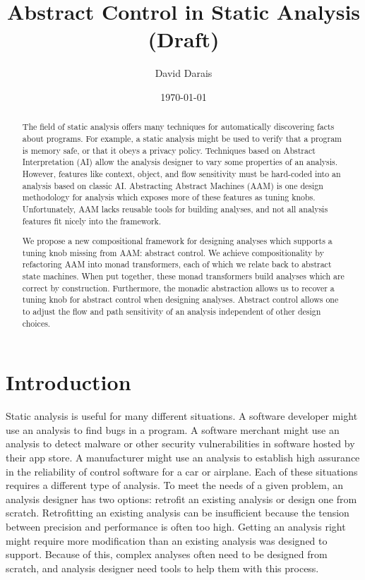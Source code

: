 \documentclass{article}
\title{Abstract Control in Static Analysis (Draft)}
\author{David Darais}
\date{\today}
\begin{document}
\maketitle


\begin{abstract}

The field of static analysis offers many techniques for automatically discovering facts about programs.
For example, a static analysis might be used to verify that a program is memory safe, or that it obeys a privacy policy.
Techniques based on Abstract Interpretation (AI) allow the analysis designer to vary some properties of an analysis.
However, features like context, object, and flow sensitivity must be hard-coded into an analysis based on classic AI.
Abstracting Abstract Machines (AAM) is one design methodology for analysis which exposes more of these features as tuning knobs.
Unfortunately, AAM lacks reusable tools for building analyses, and not all analysis features fit nicely into the framework.

We propose a new compositional framework for designing analyses which supports a tuning knob missing from AAM: abstract control.
We achieve compositionality by refactoring AAM into monad transformers, each of which we relate back to abstract state machines.
When put together, these monad transformers build analyses which are correct by construction.
Furthermore, the monadic abstraction allows us to recover a tuning knob for abstract control when designing analyses.
Abstract control allows one to adjust the flow and path sensitivity of an analysis independent of other design choices.

\end{abstract}

\tableofcontents

\section{Introduction}
\label{section:Introduction}

Static analysis is useful for many different situations.
A software developer might use an analysis to find bugs in a program.
A software merchant might use an analysis to detect malware or other security vulnerabilities in software hosted by their app store.
A manufacturer might use an analysis to establish high assurance in the reliability of control software for a car or airplane.
Each of these situations requires a different type of analysis.
To meet the needs of a given problem, an analysis designer has two options: retrofit an existing analysis or design one from scratch.
Retrofitting an existing analysis can be insufficient because the tension between precision and performance is often too high.
Getting an analysis right might require more modification than an existing analysis was designed to support.
Because of this, complex analyses often need to be designed from scratch, and analysis designer need tools to help them with this process.
\end{document}
